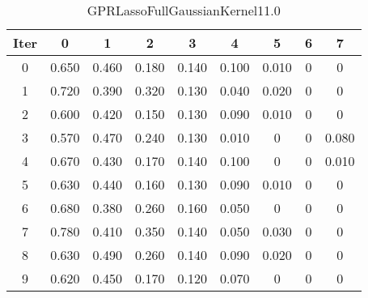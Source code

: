 \begin{table}
	\begin{center}
		\begin{tabular}{|c|c|c|c|c|c|c|c|c|}
			\hline
			Iter & 0 & 1 & 2 & 3 & 4 & 5 & 6 & 7 \\
			\hline
			0 & 0.650 & 0.460 & 0.180 & 0.140 & 0.100 & 0.010 & 0 & 0 \\
			\hline
			1 & 0.720 & 0.390 & 0.320 & 0.130 & 0.040 & 0.020 & 0 & 0 \\
			\hline
			2 & 0.600 & 0.420 & 0.150 & 0.130 & 0.090 & 0.010 & 0 & 0 \\
			\hline
			3 & 0.570 & 0.470 & 0.240 & 0.130 & 0.010 & 0 & 0 & 0.080 \\
			\hline
			4 & 0.670 & 0.430 & 0.170 & 0.140 & 0.100 & 0 & 0 & 0.010 \\
			\hline
			5 & 0.630 & 0.440 & 0.160 & 0.130 & 0.090 & 0.010 & 0 & 0 \\
			\hline
			6 & 0.680 & 0.380 & 0.260 & 0.160 & 0.050 & 0 & 0 & 0 \\
			\hline
			7 & 0.780 & 0.410 & 0.350 & 0.140 & 0.050 & 0.030 & 0 & 0 \\
			\hline
			8 & 0.630 & 0.490 & 0.260 & 0.140 & 0.090 & 0.020 & 0 & 0 \\
			\hline
			9 & 0.620 & 0.450 & 0.170 & 0.120 & 0.070 & 0 & 0 & 0 \\
			\hline
		\end{tabular}
	\end{center}
	\caption{GPRLassoFullGaussianKernel11.0}
\end{table}